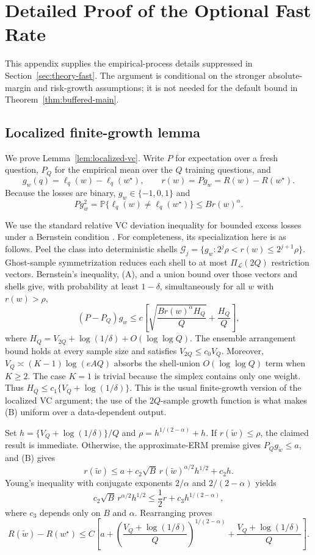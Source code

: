 \section{Detailed Proof of the Optional Fast Rate}
\label{app:fast-rate-proofs}

This appendix supplies the empirical-process details suppressed in
Section~\ref{sec:theory-fast}.  The argument is conditional on the stronger
absolute-margin and risk-growth assumptions; it is not needed for the default
bound in Theorem~\ref{thm:buffered-main}.

\subsection{Localized finite-growth lemma}

We prove Lemma~\ref{lem:localized-vc}.  Write \(P\) for expectation over a fresh
question, \(P_Q\) for the empirical mean over the \(Q\) training questions, and
\[
g_w(q)=\ell_q(w)-\ell_q(w^\star),
\qquad
r(w)=Pg_w=R(w)-R(w^\star).
\]
Because the losses are binary, \(g_w\in\{-1,0,1\}\) and
\[
Pg_w^2
=
\mathbb P\{\ell_q(w)\ne\ell_q(w^\star)\}
\le
B r(w)^\alpha.
\tag{A}
\label{eq:app-bernstein-second-moment}
\]

We use the standard relative VC deviation inequality for bounded excess losses
under a Bernstein condition \citep{massart2006risk,bartlett2005local,
koltchinskii2006local}.  For completeness, its specialization here is as
follows.  Peel the class into deterministic shells
\(\mathcal G_j=\{g_w:2^j\rho<r(w)\le2^{j+1}\rho\}\).  Ghost-sample
symmetrization reduces each shell to at most
\(\Pi_{\mathcal L}(2Q)\) restriction vectors.  Bernstein's inequality, (A), and
a union bound over those vectors and shells give, with probability at least
\(1-\delta\), simultaneously for all \(w\) with \(r(w)>\rho\),
\[
(P-P_Q)g_w
\le
c\left[
\sqrt{\frac{B r(w)^\alpha H_Q}{Q}}
+
\frac{H_Q}{Q}
\right],
\tag{B}
\label{eq:app-relative-vc}
\]
where \(H_Q=V_{2Q}+\log(1/\delta)+O(\log\log Q)\).
The ensemble arrangement bound holds at every sample size and satisfies
\(V_{2Q}\le c_0V_Q\).  Moreover,
\(V_Q\asymp(K-1)\log(eAQ)\) absorbs the shell-union
\(O(\log\log Q)\) term when \(K\ge2\).  The case \(K=1\) is trivial because the
simplex contains only one weight.  Thus \(H_Q\le
c_1\{V_Q+\log(1/\delta)\}\).  This is the usual finite-growth version of the
localized VC argument; the use of the \(2Q\)-sample growth function is what
makes (B) uniform over a data-dependent output.

Set \(h=\{V_Q+\log(1/\delta)\}/Q\) and
\(\rho=h^{1/(2-\alpha)}+h\).  If
\(r(\widetilde w)\le\rho\), the claimed result is immediate.  Otherwise, the
approximate-ERM premise gives \(P_Qg_{\widetilde w}\le a\), and (B) gives
\[
r(\widetilde w)
\le
a+c_2\sqrt B\,r(\widetilde w)^{\alpha/2}h^{1/2}+c_2h.
\]
Young's inequality with conjugate exponents \(2/\alpha\) and
\(2/(2-\alpha)\) yields
\[
c_2\sqrt B\,r^{\alpha/2}h^{1/2}
\le
\frac12r+c_3h^{1/(2-\alpha)},
\]
where \(c_3\) depends only on \(B\) and \(\alpha\).  Rearranging proves
\[
R(\widetilde w)-R(w^\star)
\le
C\left[
a+
\left(\frac{V_Q+\log(1/\delta)}{Q}\right)^{1/(2-\alpha)}
+
\frac{V_Q+\log(1/\delta)}{Q}
\right].
\]

